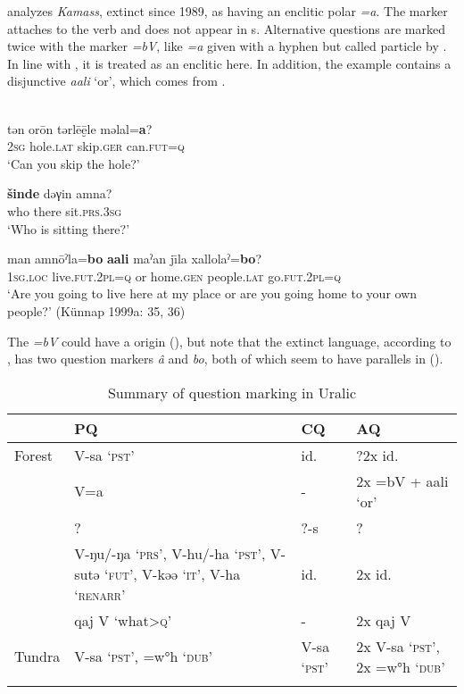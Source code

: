 \citet[15]{Miestamo2011} analyzes \textit{Kamass}, extinct since 1989, as having an enclitic polar  \textit{=a}. The marker attaches to the verb and does not appear in s. Alternative questions are marked twice with the marker \textit{=bV}, like \textit{=a} given with a hyphen but called particle by \cite[35f.]{Künnap1999a}. In line with  , it is treated as an enclitic here. In addition, the example contains a disjunctive \textit{aali} ‘or’, which comes from  \citep[189]{Joki1944}.

\ea%
    \label{ex:ural:15}
    \\
    \ea
    \gll tən  or\=on    tərl\=eē̮le    mə{lal=}\textbf{{a}}?\\
    2\textsc{sg}  hole.\textsc{lat} skip.\textsc{ger}  can.\textsc{fut}=\textsc{q}\\
    \glt ‘Can you skip the hole?’
    
    \ex
    \gll \textbf{{šinde}} dəγin  amna?\\
    who  there  sit.\textsc{prs}.3\textsc{sg}\\
    \glt ‘Who is sitting there?’
    
    \ex
    \gll man    amn\=oˀla=\textbf{{bo}} \textbf{{aali}} maˀan    j\={\i}la xallolaˀ=\textbf{{bo}}?\\
    1\textsc{sg}.\textsc{loc}  live.\textsc{fut}.2\textsc{pl}=\textsc{q}  or  home.\textsc{gen}  people.\textsc{lat} go.\textsc{fut}.2\textsc{pl}=\textsc{q}\\
    \glt ‘Are you going to live here at my place or are you going home to your own people?’ (Künnap 1999a: 35, 36)\z\z

\noindent The  \textit{=bV} could have a  origin (), but note that the extinct  language, according to \cite{Castrén1858}, has two question markers \textit{â} and \textit{bo}, both of which seem to have parallels in  ().

\begin{table}
\caption{Summary of question marking in Uralic}
\label{tab:ural:2}

\begin{tabularx}{\textwidth}{lQlQ}
\lsptoprule
& \textbf{PQ} & \textbf{CQ} & \textbf{AQ}\\
\midrule
Forest  & V-sa ‘\textsc{pst}’ & id. & ?2x id.\\
 & V=a & - & 2x =bV + aali ‘or’\\
 & ? & ?-s & ?\\
 & V-ŋu/-ŋa ‘\textsc{prs}’, V-hu/-ha ‘\textsc{pst}’, V-sutə ‘\textsc{fut}’, V-kəə ‘\textsc{it}’, V-ha ‘\textsc{renarr}’ & id. & 2x id.\\
 & qaj V ‘what>\textsc{q}’ & - & 2x qaj V\\
Tundra  & V-sa ‘\textsc{pst}’, =w°h ‘\textsc{dub}’ & V-sa ‘\textsc{pst}’ & 2x V-sa ‘\textsc{pst}’, 2x =w°h ‘\textsc{dub}’\\
\lspbottomrule
\end{tabularx}
\end{table}

